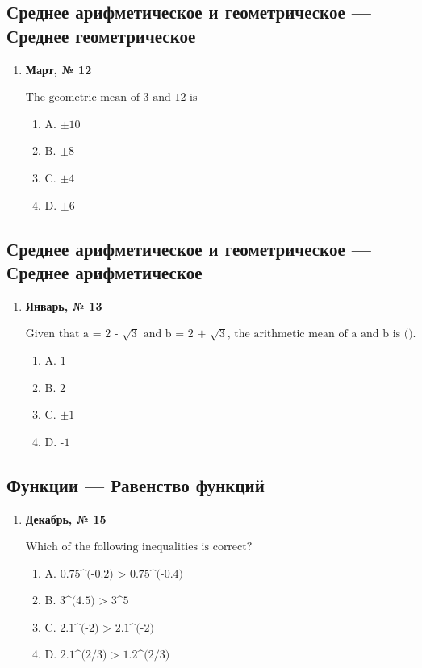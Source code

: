 \subsection*{Среднее арифметическое и геометрическое — Среднее геометрическое}
\begin{enumerate}
\item \textbf{Март, № 12} \par \smallskip
$\displaystyle \text{The geometric mean of 3 and 12 is}$
\begin{enumerate}
\item $\displaystyle \text{A. ±10}$
\item $\displaystyle \text{B. ±8}$
\item $\displaystyle \text{C. ±4}$
\item $\displaystyle \text{D. ±6}$
\end{enumerate}
\end{enumerate}

\subsection*{Среднее арифметическое и геометрическое — Среднее арифметическое}
\begin{enumerate}
\item \textbf{Январь, № 13} \par \smallskip
$\displaystyle \text{Given that a = 2 - }\sqrt{3}\text{ and b = 2 + }\sqrt{3}\text{, the arithmetic mean of a and b is ().}$
\begin{enumerate}
\item $\displaystyle \text{A. 1}$
\item $\displaystyle \text{B. 2}$
\item $\displaystyle \text{C. ±1}$
\item $\displaystyle \text{D. -1}$
\end{enumerate}
\end{enumerate}

\subsection*{Функции — Равенство функций}
\begin{enumerate}
\item \textbf{Декабрь, № 15} \par \smallskip
$\displaystyle \text{Which of the following inequalities is correct?}$
\begin{enumerate}
\item $\displaystyle \text{A. 0.75^(-0.2) > 0.75^(-0.4)}$
\item $\displaystyle \text{B. 3^(4.5) > 3^5}$
\item $\displaystyle \text{C. 2.1^(-2) > 2.1^(-2)}$
\item $\displaystyle \text{D. 2.1^(2/3) > 1.2^(2/3)}$
\end{enumerate}
\end{enumerate}

